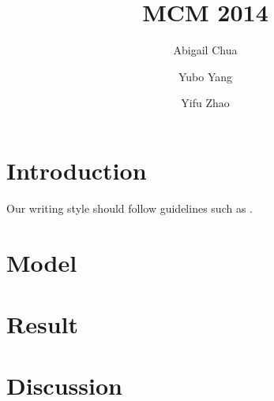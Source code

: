 \documentclass[aps,prl,superscriptaddress,12pt]{revtex4-1}
\begin{document}
	\title{MCM 2014}
	\author{Abigail Chua}
	\author{Yubo Yang}
	\author{Yifu Zhao}
		
	\begin{abstract}
		
	\end{abstract}
	
\maketitle

	\section{Introduction}
		Our writing style should follow guidelines such as \cite{science_writing}.

	\section{Model}

	\pagebreak

	\section{Result}

	\section{Discussion}
	


\end{document}
